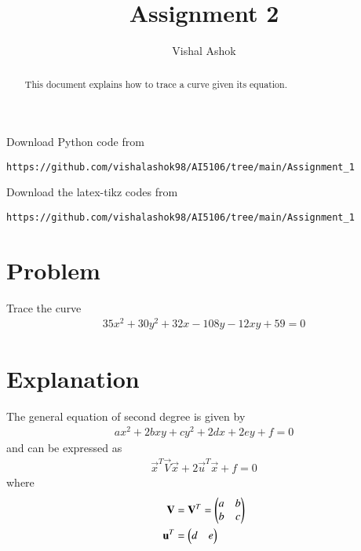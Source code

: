 \documentclass[journal,12pt,twocolumn]{IEEEtran}
\begin{document}
\renewcommand{\thefigure}{\theproblem}
\def\putbox#1#2#3{\makebox[0in][l]{\makebox[#1][l]{}\raisebox{\baselineskip}[0in][0in]{\raisebox{#2}[0in][0in]{#3}}}}
     \def\rightbox#1{\makebox[0in][r]{#1}}
     \def\centbox#1{\makebox[0in]{#1}}
     \def\topbox#1{\raisebox{-\baselineskip}[0in][0in]{#1}}
     \def\midbox#1{\raisebox{-0.5\baselineskip}[0in][0in]{#1}}
\vspace{3cm}
\title{Assignment 2}
\author{Vishal Ashok}
\maketitle
\newpage
\bigskip
\renewcommand{\thefigure}{\theenumi}
\renewcommand{\thetable}{\theenumi}
\begin{abstract}
This document explains how to trace a curve given its equation.
\end{abstract}
Download Python code from 
%
\begin{lstlisting}
https://github.com/vishalashok98/AI5106/tree/main/Assignment_1
\end{lstlisting}
%
Download the latex-tikz codes from 
%
\begin{lstlisting}
https://github.com/vishalashok98/AI5106/tree/main/Assignment_1
\end{lstlisting}
%

\section{Problem}

Trace the curve
\begin{align}
35x^2+30y^2+32x-108y-12xy+59=0 \label{given_curve_eq}
\end{align}


\section{Explanation}

The general equation of second degree is given by
\begin{align}
ax^2+2bxy+cy^2+2dx+2ey+f=0 \label{gen_quad_eqn}
\end{align}
and can be expressed as
\begin{align}
\vec{x}^T\vec{V}\vec{x}+2\vec{u}^T\vec{x}+f=0 \label{conic_quad_eqn}
\end{align}
where
\begin{align}
\mathbf{V} &= \mathbf{V}^T = \begin{pmatrix}a & b \\ b & c\end{pmatrix}
\\
\mathbf{u}^T &= \begin{pmatrix}d & e\end{pmatrix}
\end{align}
\end{document}
